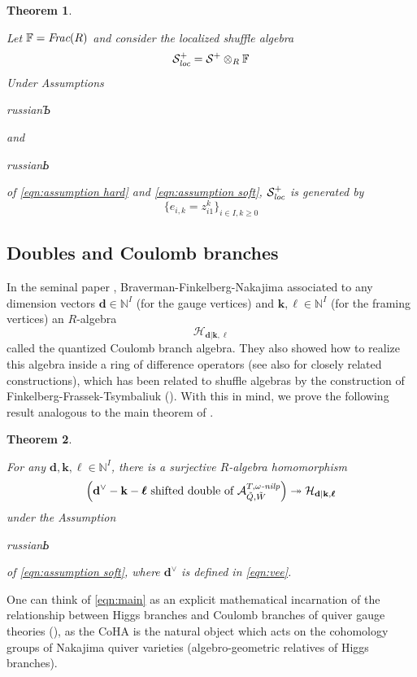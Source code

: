 \documentclass{amsart}
\newtheorem{theorem}{Theorem}[section]
\def\BF{{\mathbb{F}}}
\def\CH{{\mathcal{H}}}
\def\CS{{\mathcal{S}}}
\def\bd{{\mathbf{d}}}
\def\bk{{\mathbf{k}}}
\def\bell{\boldsymbol{\ell}}
\def\nn{{\mathbb{N}^I}}
\def\tQ{\tilde{Q}}
\def\tW{\tilde{W}}
\def\ring{R}
\def\field{\BF}
\def\soft{\begin{otherlanguage*}{russian}Ь \end{otherlanguage*}}
\def\hard{\begin{otherlanguage*}{russian}Ъ \end{otherlanguage*}}
\def\ekha{\mathcal{A}^{T,\omega\emph{-nilp}}_{\tQ,\tW}}
\begin{document}
\medskip 

\begin{theorem}
\label{thm:intro spherical}

Let $\field = \emph{Frac}(\ring)$ and consider the localized shuffle algebra
$$
\CS^+_{\emph{loc}} = \CS^+ \otimes_{\ring} \field 
$$
Under Assumptions \hard and \soft of \eqref{eqn:assumption hard} and \eqref{eqn:assumption soft}, $\CS^+_{\emph{loc}}$ is generated by
$$
\Big\{e_{i,k} = z_{i1}^k \Big\}_{i \in I, k \geq 0}
$$

\end{theorem}

\medskip

\subsection{Doubles and Coulomb branches}
\label{sub:doubles intro}

In the seminal paper \cite{BFN}, Braverman-Finkelberg-Nakajima associated to any dimension vectors $\bd \in \nn$ (for the gauge vertices) and $\bk,\bell \in \nn$ (for the framing vertices) an $\ring$-algebra
$$
\CH_{\bd|\bk,\bell}  
$$
called the quantized Coulomb branch algebra. They also showed how to realize this algebra inside a ring of difference operators (see also \cite{GKLO, KWWY} for closely related constructions), which has been related to shuffle algebras by the construction of Finkelberg-Frassek-Tsymbaliuk (\cite{FT2, FrT,Tsymbaliuk}). With this in mind, we prove the following result analogous to the main theorem of \cite{JNCoulomb}.

\medskip 

\begin{theorem}
\label{thm:intro main}

For any $\bd,\bk,\bell \in \nn$, there is a surjective $\ring$-algebra homomorphism
\begin{equation}
\label{eqn:main}
\Big(\bd^\vee-\bk-\bell\text{ shifted double of }\ekha \Big) \twoheadrightarrow \CH_{\bd|\bk,\bell} 
\end{equation}
under the Assumption \soft of \eqref{eqn:assumption soft}, where $\bd^\vee$ is defined in \eqref{eqn:vee}.
    
\end{theorem}

\medskip 

\noindent One can think of \eqref{eqn:main} as an explicit mathematical incarnation of the relationship between Higgs branches and Coulomb branches of quiver gauge theories (\cite{CL, RSYZ}), as the CoHA is the natural object which acts on the cohomology groups of Nakajima quiver varieties (algebro-geometric relatives of Higgs branches).
\end{document}
